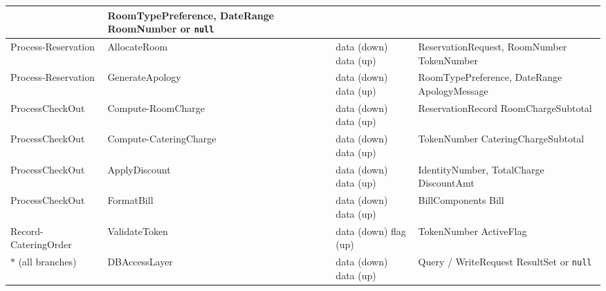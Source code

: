 \documentclass[12pt,a4paper]{article}
\begin{document}
\begin{longtable}{|L{3cm}|L{3cm}|L{3cm}|L{4.5cm}|}
                                                  & RoomTypePreference, DateRange \newline RoomNumber or \texttt{null} \\
  \hline
  Process-Reservation   & AllocateRoom         & data (down) \newline data (up)
                                                  & ReservationRequest, RoomNumber \newline TokenNumber \\
  \hline
  Process-Reservation   & GenerateApology      & data (down) \newline data (up)
                                                  & RoomTypePreference, DateRange \newline ApologyMessage \\
  \hline
  ProcessCheckOut      & Compute-RoomCharge    & data (down) \newline data (up)
                                                  & ReservationRecord \newline RoomChargeSubtotal \\
  \hline
  ProcessCheckOut      & Compute-CateringCharge & data (down) \newline data (up)
                                                  & TokenNumber \newline CateringChargeSubtotal \\
  \hline
  ProcessCheckOut      & ApplyDiscount        & data (down) \newline data (up)
                                                  & IdentityNumber, TotalCharge \newline DiscountAmt \\
  \hline
  ProcessCheckOut      & FormatBill           & data (down) \newline data (up)
                                                  & BillComponents \newline Bill \\
  \hline
  Record-CateringOrder  & ValidateToken        & data (down) \newline flag (up)
                                                  & TokenNumber \newline ActiveFlag \\
  \hline
  $*$ (all branches)   & DBAccessLayer        & data (down) \newline data (up)
                                                  & Query / WriteRequest \newline ResultSet or \texttt{null} \\
  \hline
\end{longtable}
\end{document}
